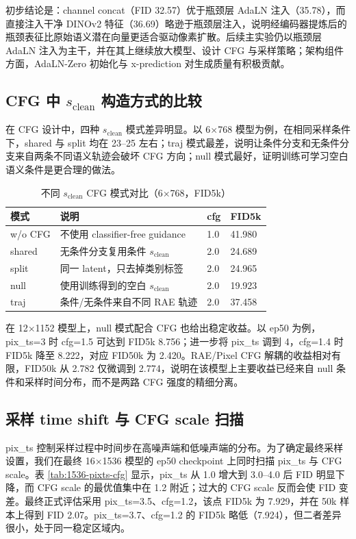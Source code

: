 \documentclass[11pt]{article}
\begin{document}
初步结论是：channel concat（FID 32.57）优于瓶颈层 AdaLN 注入（35.78），而直接注入干净 DINOv2 特征（36.69）略逊于瓶颈层注入，说明经编码器提炼后的瓶颈表征比原始语义潜在向量更适合驱动像素扩散。后续主实验仍以瓶颈层 AdaLN 注入为主干，并在其上继续放大模型、设计 CFG 与采样策略；架构组件方面，AdaLN-Zero 初始化与 x-prediction 对生成质量有积极贡献。

\subsection{CFG 中 $s_{\mathrm{clean}}$ 构造方式的比较}
\label{app:cfg-details}

在 CFG 设计中，四种 $s_{\mathrm{clean}}$ 模式差异明显。以 6$\times$768 模型为例，在相同采样条件下，shared 与 split 均在 23--25 左右；traj 模式最差，说明让条件分支和无条件分支来自两条不同语义轨迹会破坏 CFG 方向；null 模式最好，证明训练可学习空白语义条件是更合理的做法。

\begin{table}[H]
\centering
\caption{不同 $s_{\mathrm{clean}}$ CFG 模式对比（6$\times$768，FID5k）}
\begin{tabular}{llll}
\toprule
模式 & 说明 & cfg & FID5k \\
\midrule
w/o CFG & 不使用 classifier-free guidance & 1.0 & 41.980 \\
shared & 无条件分支复用条件 $s_{\mathrm{clean}}$ & 2.0 & 24.689 \\
split & 同一 latent，只去掉类别标签 & 2.0 & 24.965 \\
null & 使用训练得到的空白 $s_{\mathrm{clean}}$ & 2.0 & 19.923 \\
traj & 条件/无条件来自不同 RAE 轨迹 & 2.0 & 37.458 \\
\bottomrule
\end{tabular}
\end{table}

在 12$\times$1152 模型上，null 模式配合 CFG 也给出稳定收益。以 ep50 为例，pix\_ts=3 时 cfg=1.5 可达到 FID5k 8.756；进一步将 pix\_ts 调到 4，cfg=1.4 时 FID5k 降至 8.222，对应 FID50k 为 2.420。RAE/Pixel CFG 解耦的收益相对有限，FID50k 从 2.782 仅微调到 2.774，说明在该模型上主要收益已经来自 null 条件和采样时间分布，而不是两路 CFG 强度的精细分离。

\subsection{采样 time shift 与 CFG scale 扫描}
\label{app:pixts-details}

pix\_ts 控制采样过程中时间步在高噪声端和低噪声端的分布。为了确定最终采样设置，我们在最终 16$\times$1536 模型的 ep50 checkpoint 上同时扫描 pix\_ts 与 CFG scale。表 \ref{tab:1536-pixts-cfg} 显示，pix\_ts 从 1.0 增大到 3.0--4.0 后 FID 明显下降，而 CFG scale 的最优值集中在 1.2 附近；过大的 CFG scale 反而会使 FID 变差。最终正式评估采用 pix\_ts=3.5、cfg=1.2，该点 FID5k 为 7.929，并在 50k 样本上得到 FID 2.07。pix\_ts=3.7、cfg=1.2 的 FID5k 略低（7.924），但二者差异很小，处于同一稳定区域内。
\end{document}
